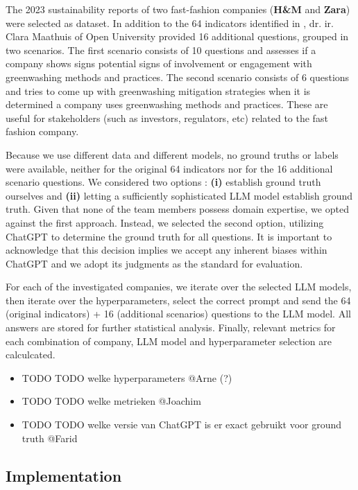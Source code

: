 \documentclass[]{article}
\begin{document}
The 2023 sustainability reports of two fast-fashion companies (\textbf{H\&M} and \textbf{Zara}) were selected as dataset.
In addition to the 64 indicators identified in \cite{durability}, dr. ir. Clara Maathuis of Open University \cite{ou} provided 16 additional questions, grouped in two scenarios.
The first scenario consists of 10 questions and assesses if a company shows signs potential signs of involvement or engagement with greenwashing methods and practices.
The second scenario consists of 6 questions and tries to come up with greenwashing mitigation strategies when it is determined a company uses greenwashing methods and practices.
These are useful for stakeholders (such as investors, regulators, etc) related to the fast fashion company.

Because we use different data and different models, no ground truths or labels were available, neither for the original 64 indicators nor for the 16 additional scenario questions.
We considered two options : \textbf{(i)} establish ground truth ourselves and \textbf{(ii)} letting a sufficiently sophisticated LLM model establish ground truth.
Given that none of the team members possess domain expertise, we opted against the first approach.
Instead, we selected the second option, utilizing ChatGPT to determine the ground truth for all questions.
It is important to acknowledge that this decision implies we accept any inherent biases within ChatGPT and we adopt its judgments as the standard for evaluation.

For each of the investigated companies, we iterate over the selected LLM models, then iterate over the hyperparameters, select the correct prompt and send the 64 (original indicators) + 16 (additional scenarios) questions to the LLM model.
All answers are stored for further statistical analysis.
Finally, relevant metrics for each combination of company, LLM model and hyperparameter selection are calculcated.

\begin{itemize}
    \item TODO TODO welke hyperparameters @Arne (?)
    \item TODO TODO welke metrieken @Joachim
    \item TODO TODO welke versie van ChatGPT is er exact gebruikt voor ground truth @Farid
\end{itemize}


\subsection{Implementation}
\end{document}
